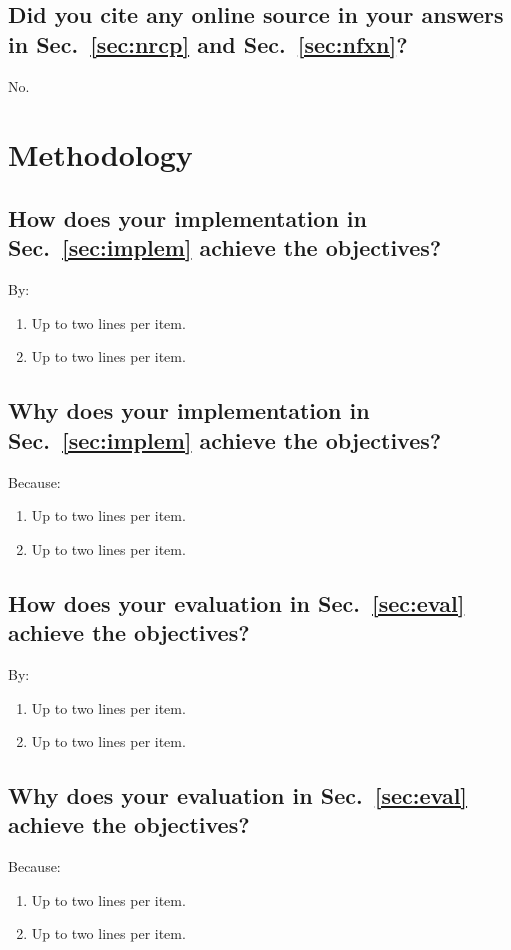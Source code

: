 \subsection{Did you cite any online source in your answers in Sec.~\ref{sec:nrcp} and Sec.~\ref{sec:nfxn}?}
No.
  
	
	
	
	
	
	
	
	
	


\section{Methodology}

\subsection{How does your implementation in Sec.~\ref{sec:implem} achieve the objectives?}
By:
\begin{enumerate}
\item Up to two lines per item.
\item Up to two lines per item.
\end{enumerate}
	
\subsection{Why does your implementation in Sec.~\ref{sec:implem} achieve the objectives?}
Because:
\begin{enumerate}
\item Up to two lines per item.
\item Up to two lines per item.
\end{enumerate}
	
\subsection{How does your evaluation in Sec.~\ref{sec:eval} achieve the objectives?}
By:
\begin{enumerate}
\item Up to two lines per item.
\item Up to two lines per item.
\end{enumerate}
	
\subsection{Why does your evaluation in Sec.~\ref{sec:eval}  achieve the objectives?}
Because:
\begin{enumerate}
\item Up to two lines per item.
\item Up to two lines per item.
\end{enumerate}



